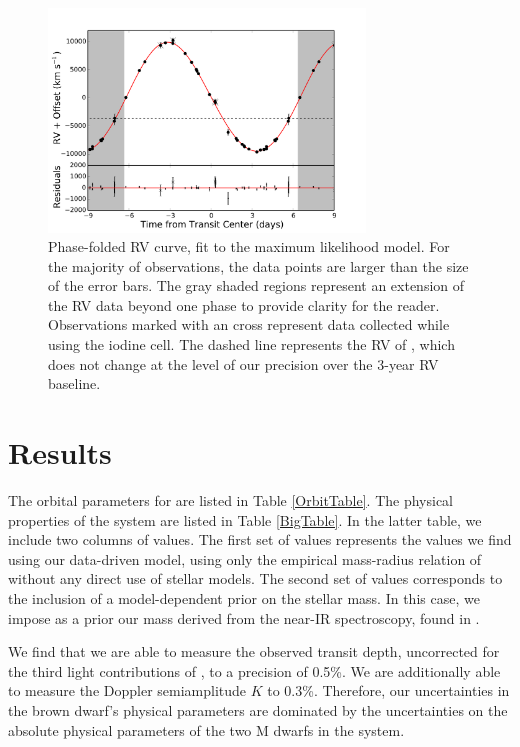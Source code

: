 \begin{figure}[htbp]
\centerline{\includegraphics[width=0.75\textwidth]{chapter4/f5.pdf}}
\caption[Phase-folded RV curve, fit to the maximum likelihood model]{Phase-folded RV curve, fit to the maximum likelihood model.
For the majority of observations, the data points are larger than the size of the error bars.
The gray shaded regions represent an extension of the RV data beyond one phase to provide clarity for the reader. 
Observations marked with an cross represent data collected while using the iodine cell.
The dashed line represents the RV of \LB{}, which does not change at the level of our precision over the 3-year RV baseline.
  }
\label{RVs}
\end{figure}



\section{Results}

The orbital parameters for \LC{} are listed in Table \ref{OrbitTable}.
The physical properties of the \LHS{} system are listed in Table \ref{BigTable}. 
In the latter table, we include two columns of values. 
The first set of values represents the values we find using our data-driven model, using only the empirical mass-radius relation of \citet{Boyajian12} without any direct use of stellar models. 
The second set of values corresponds to the inclusion of a model-dependent prior on the stellar mass.
In this case, we impose as a prior our mass derived from the near-IR spectroscopy, found in \textsection{\ref{TripleSpec}}.

We find that we are able to measure the observed transit depth, uncorrected for the third light contributions of \LB, to a precision of 0.5\%.
We are additionally able to measure the Doppler semiamplitude $K$ to 0.3\%. 
Therefore, our uncertainties in the brown dwarf's physical parameters are dominated by the uncertainties on the absolute physical parameters of the two M dwarfs in the system.

